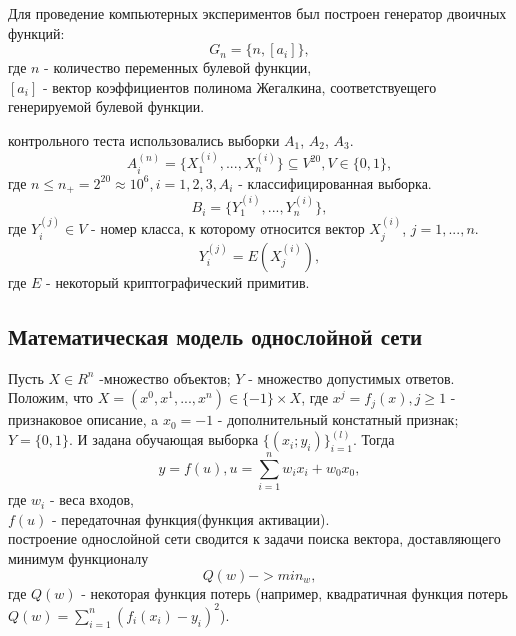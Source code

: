 \documentclass[a4paper,12pt,twoside]{article}
\begin{document}
	Для проведение компьютерных экспериментов был построен генератор двоичных функций:
	\begin{equation}
		G_n = \{n, [a_i]\},
	\end{equation}
	где $n$ - количество переменных булевой функции,\\
	$[a_i]$ - вектор коэффициентов полинома Жегалкина, соответствуещего генерируемой булевой функции.
	\bigskip
	
	 контрольного теста использовались выборки $A_1$, $A_2$, $A_3$.\\
	\begin{equation}
		A_i^{(n)} = \{X_1^{(i)}, ..., X_n^{(i)}\} \subseteq V^{20}, V \in \{0, 1\},
	\end{equation}
	где $n \leq n_{+} = 2^{20}\approx10^6, i=1,2,3, A_i$ - классифицированная выборка.
	\bigskip
	\begin{equation}
	B_i = \{Y_1^{(i)}, ..., Y_n^{(i)}\},
	\end{equation}
	где $Y_i^{(j)} \in V$ - номер класса, к которому относится вектор $X_j^{(i)}$, $j=1,...,n$.
	\begin{equation}
	Y_i^{(j)} = E(X_j^{(i)}),
	\end{equation}
	где $E$ - некоторый криптографический примитив.
	\bigskip
	
	\subsection{Математическая модель однослойной сети}
	\bigskip
	Пусть $X \in R^n$ -множество объектов; $Y$ - множество допустимых ответов. Положим, что
	$X = (x^0, x^1, ..., x^n) \in \{-1\} \times X$, где $x^j = f_j(x), j \geq 1$ - признаковое описание, a $x_0 = -1$ - дополнительный констатный признак; $Y = \{0, 1\}$. И задана обучающая выборка $\{(x_i;y_i)\}_{i=1}^{(l)}$. Тогда \\
	\begin{equation}
	y = f(u), u = \sum_{i=1}^{n}w_ix_i + w_0x_0,
	\end{equation}
	где $w_i$ - веса входов,\\
	$f(u)$ - передаточная функция(функция активации).\\

	 построение однослойной сети сводится к задачи поиска вектора, доставляющего минимум функционалу
	\begin{equation}
	Q(w) -> min_{w},
	\end{equation}
	где $Q(w)$ - некоторая функция потерь (например, квадратичная функция потерь $Q(w) = \sum_{i=1}^n(f_i(x_i) - y_i)^2$).
	
\end{document}
